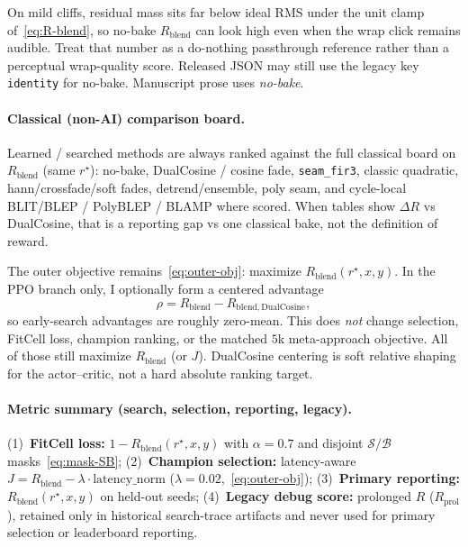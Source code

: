 On mild cliffs, residual mass sits far below ideal RMS under the unit clamp of~\eqref{eq:R-blend}, so no-bake $R_{\mathrm{blend}}$ can look high even when the wrap click remains audible.
Treat that number as a do-nothing passthrough reference rather than a perceptual wrap-quality score.
Released JSON may still use the legacy key \texttt{identity} for no-bake.
Manuscript prose uses \emph{no-bake}.

\paragraph{Classical (non-AI) comparison board.}
\label{sec:classical-board}
Learned / searched methods are always ranked against the full classical board on $R_{\mathrm{blend}}$ (same $r^{\star}$):
no-bake, DualCosine / cosine fade, \texttt{seam\_fir3}, classic quadratic, hann/crossfade/soft fades, detrend/ensemble, poly seam, and cycle-local BLIT/BLEP / PolyBLEP / BLAMP where scored.
When tables show $\Delta R$ vs DualCosine, that is a reporting gap vs one classical bake, not the definition of reward.

\begin{remark}
\label{rem:dualcosine-centering}
The outer objective remains~\eqref{eq:outer-obj}: maximize $R_{\mathrm{blend}}(r^{\star},x,y)$.
In the PPO branch only, I optionally form a centered advantage
\begin{equation}
\label{eq:dualcosine-centering}
\rho = R_{\mathrm{blend}} - R_{\mathrm{blend},\mathrm{DualCosine}},
\end{equation}
so early-search advantages are roughly zero-mean.
This does \emph{not} change selection, FitCell loss, champion ranking, or the matched $5$k meta-approach objective.
All of those still maximize $R_{\mathrm{blend}}$ (or $J$).
DualCosine centering is soft relative shaping for the actor--critic, not a hard absolute ranking target.
\end{remark}

\paragraph{Metric summary (search, selection, reporting, legacy).}
(1)~\textbf{FitCell loss:} $1 - R_{\mathrm{blend}}(r^{\star},x,y)$ with $\alpha{=}0.7$ and disjoint $\mathcal{S}/\mathcal{B}$ masks~\eqref{eq:mask-SB};
(2)~\textbf{Champion selection:} latency-aware $J = R_{\mathrm{blend}} - \lambda\cdot\mathrm{latency\_norm}$ ($\lambda{=}0.02$,~\eqref{eq:outer-obj});
(3)~\textbf{Primary reporting:} $R_{\mathrm{blend}}(r^{\star},x,y)$ on held-out seeds;
(4)~\textbf{Legacy debug score:} prolonged $R$ ($R_{\mathrm{prol}}$), retained only in historical search-trace artifacts and never used for primary selection or leaderboard reporting.

